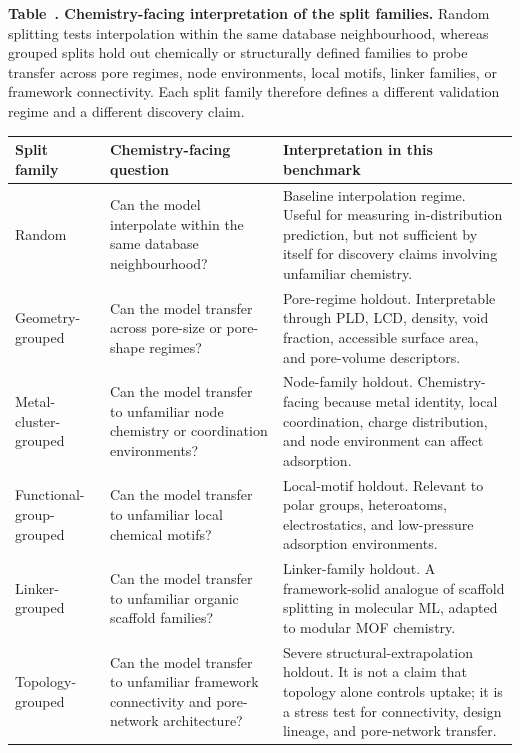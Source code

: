 \documentclass[11pt,a4paper]{article}
\begin{document}
\begin{center}
\begin{minipage}{0.94\textwidth}
\small
\renewcommand{\arraystretch}{1.18}

\label{tab:split_family_chemistry_map}
\textbf{Table~\thetable. Chemistry-facing interpretation of the split families.}
Random splitting tests interpolation within the same database neighbourhood, whereas grouped splits hold out chemically or structurally defined families to probe transfer across pore regimes, node environments, local motifs, linker families, or framework connectivity. Each split family therefore defines a different validation regime and a different discovery claim.

\medskip

\begin{tabular}{p{} p{} p{}}
\toprule
\textbf{Split family} &
\textbf{Chemistry-facing question} &
\textbf{Interpretation in this benchmark}
\tabularnewline
\midrule

Random &
Can the model interpolate within the same database neighbourhood? &
Baseline interpolation regime. Useful for measuring in-distribution prediction, but not sufficient by itself for discovery claims involving unfamiliar chemistry.
\tabularnewline

Geometry-grouped &
Can the model transfer across pore-size or pore-shape regimes? &
Pore-regime holdout. Interpretable through PLD, LCD, density, void fraction, accessible surface area, and pore-volume descriptors.
\tabularnewline

Metal-cluster-grouped &
Can the model transfer to unfamiliar node chemistry or coordination environments? &
Node-family holdout. Chemistry-facing because metal identity, local coordination, charge distribution, and node environment can affect adsorption.
\tabularnewline

Functional-group-grouped &
Can the model transfer to unfamiliar local chemical motifs? &
Local-motif holdout. Relevant to polar groups, heteroatoms, electrostatics, and low-pressure adsorption environments.
\tabularnewline

Linker-grouped &
Can the model transfer to unfamiliar organic scaffold families? &
Linker-family holdout. A framework-solid analogue of scaffold splitting in molecular ML, adapted to modular MOF chemistry.
\tabularnewline

Topology-grouped &
Can the model transfer to unfamiliar framework connectivity and pore-network architecture? &
Severe structural-extrapolation holdout. It is not a claim that topology alone controls uptake; it is a stress test for connectivity, design lineage, and pore-network transfer.
\tabularnewline

\bottomrule
\end{tabular}

\end{minipage}
\end{center}
\medskip
\end{document}
